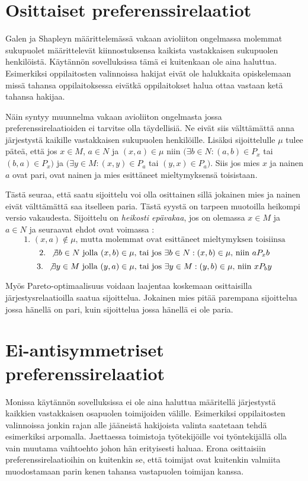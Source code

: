 \documentclass[gradu, twoside]{tktltiki}
\begin{document}
\section{Osittaiset preferenssirelaatiot}

Galen ja Shapleyn määrittelemässä vakaan avioliiton ongelmassa
molemmat sukupuolet määrittelevät kiinnostuksensa kaikista
vastakkaisen sukupuolen henkilöistä. Käytännön sovelluksissa tämä ei
kuitenkaan ole aina haluttua. Esimerkiksi oppilaitosten valinnoissa
hakijat eivät ole halukkaita opiskelemaan missä tahansa
oppilaitoksessa eivätkä oppilaitokset halua ottaa vastaan ketä tahansa
hakijaa.

Näin syntyy muunnelma vakaan avioliiton ongelmasta jossa
preferenssirelaatioiden ei tarvitse olla täydellisiä. Ne eivät siis
välttämättä anna järjestystä kaikille vastakkaisen sukupuolen
henkilöille. Lisäksi sijoittelulle $\mu$ tulee päteä, että jos $x \in
M$, $a \in N$ ja $(x, a) \in \mu$ niin $(\exists b \in N: (a, b) \in
P_x$ tai $(b, a) \in P_x)$ ja $(\exists y \in M: (x, y) \in P_a$ tai
$(y, x) \in P_a)$. Siis jos mies $x$ ja nainen $a$ ovat pari, ovat
nainen ja mies esittäneet mieltymyksensä toisistaan.

Tästä seuraa, että saatu sijoittelu voi olla osittainen sillä jokainen
mies ja nainen eivät välttämättä saa itselleen paria. Tästä syystä on
tarpeen muotoilla heikompi versio vakaudesta. Sijoittelu on
\emph{heikosti epävakaa}, jos on olemassa $x \in M$ ja $a \in N$ ja
seuraavat ehdot ovat voimassa \cite{gusfield89}:
\[
\text{1. }(x, a) \notin \mu\text{, mutta molemmat ovat esittäneet
  mieltymyksen toisiinsa}
\]
\[
\text{2. }\not\exists b \in N \text{ jolla }(x, b) \in \mu\text{, tai jos
}\exists b \in N: (x, b) \in \mu \text{, niin }aP_xb
\]
\[
\text{3. }\not\exists y \in M\text{ jolla }(y, a) \in \mu\text{, tai
  jos }\exists y \in M: (y, b) \in \mu\text{, niin }xP_by
\]

Myös Pareto-optimaalisuus voidaan laajentaa koskemaan osittaisilla
järjestysrelaatioilla saatua sijoittelua. Jokainen mies pitää
parempana sijoittelua jossa hänellä on pari, kuin sijoittelua jossa
hänellä ei ole paria. \cite{gusfield89}

\section{Ei-antisymmetriset preferenssirelaatiot}

Monissa käytännön sovelluksissa ei ole aina haluttua määritellä
järjestystä kaikkien vastakkaisen osapuolen toimijoiden välille.
Esimerkiksi oppilaitosten valinnoissa jonkin rajan alle jääneistä
hakijoista valinta saatetaan tehdä esimerkiksi arpomalla. Jaettaessa
toimistoja työtekijöille voi työntekijällä olla vain muutama
vaihtoehto johon hän erityisesti haluaa. Erona osittaisiin
preferenssirelaatioihin on kuitenkin se, että toimijat ovat kuitenkin
valmiita muodostamaan parin kenen tahansa vastapuolen toimijan kanssa.
\end{document}

